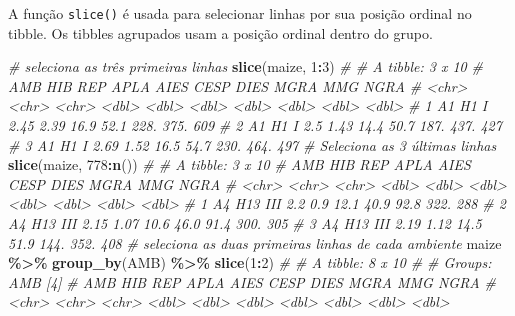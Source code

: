\documentclass[
]{book}
\makeatletter
\newenvironment{Shaded}{\begin{snugshade}}{\end{snugshade}}
\newcommand{\CommentTok}[1]{\textcolor[rgb]{0.56,0.35,0.01}{\textit{#1}}}
\newcommand{\DecValTok}[1]{\textcolor[rgb]{0.00,0.00,0.81}{#1}}
\newcommand{\KeywordTok}[1]{\textcolor[rgb]{0.13,0.29,0.53}{\textbf{#1}}}
\newcommand{\NormalTok}[1]{#1}
\newcommand{\OperatorTok}[1]{\textcolor[rgb]{0.81,0.36,0.00}{\textbf{#1}}}
\newcommand{\StringTok}[1]{\textcolor[rgb]{0.31,0.60,0.02}{#1}}
\numberwithin{equation}{section}
\newcommand{\indf}[1]{\index[function]{#1@\texttt{#1()}|ST}}
\makeatother
\begin{document}
A função \texttt{slice()}\indf{slice} é usada para selecionar linhas por sua posição ordinal no tibble. Os tibbles agrupados usam a posição ordinal dentro do grupo.

\begin{Shaded}
\begin{Highlighting}[]
\CommentTok{\# seleciona as três primeiras linhas}
\KeywordTok{slice}\NormalTok{(maize, }\DecValTok{1}\OperatorTok{:}\DecValTok{3}\NormalTok{)}
\CommentTok{\# \# A tibble: 3 x 10}
\CommentTok{\#   AMB   HIB   REP    APLA  AIES  CESP  DIES  MGRA   MMG  NGRA}
\CommentTok{\#   \textless{}chr\textgreater{} \textless{}chr\textgreater{} \textless{}chr\textgreater{} \textless{}dbl\textgreater{} \textless{}dbl\textgreater{} \textless{}dbl\textgreater{} \textless{}dbl\textgreater{} \textless{}dbl\textgreater{} \textless{}dbl\textgreater{} \textless{}dbl\textgreater{}}
\CommentTok{\# 1 A1    H1    I      2.45  2.39  16.9  52.1  228.  375.   609}
\CommentTok{\# 2 A1    H1    I      2.5   1.43  14.4  50.7  187.  437.   427}
\CommentTok{\# 3 A1    H1    I      2.69  1.52  16.5  54.7  230.  464.   497}
\CommentTok{\# Seleciona as 3 últimas linhas}
\KeywordTok{slice}\NormalTok{(maize, }\DecValTok{778}\OperatorTok{:}\KeywordTok{n}\NormalTok{())}
\CommentTok{\# \# A tibble: 3 x 10}
\CommentTok{\#   AMB   HIB   REP    APLA  AIES  CESP  DIES  MGRA   MMG  NGRA}
\CommentTok{\#   \textless{}chr\textgreater{} \textless{}chr\textgreater{} \textless{}chr\textgreater{} \textless{}dbl\textgreater{} \textless{}dbl\textgreater{} \textless{}dbl\textgreater{} \textless{}dbl\textgreater{} \textless{}dbl\textgreater{} \textless{}dbl\textgreater{} \textless{}dbl\textgreater{}}
\CommentTok{\# 1 A4    H13   III    2.2   0.9   12.1  40.9  92.8  322.   288}
\CommentTok{\# 2 A4    H13   III    2.15  1.07  10.6  46.0  91.4  300.   305}
\CommentTok{\# 3 A4    H13   III    2.19  1.12  14.5  51.9 144.   352.   408}
\CommentTok{\# seleciona as duas primeiras linhas de cada ambiente}
\NormalTok{maize }\OperatorTok{\%\textgreater{}\%}
\StringTok{  }\KeywordTok{group\_by}\NormalTok{(AMB) }\OperatorTok{\%\textgreater{}\%}
\StringTok{  }\KeywordTok{slice}\NormalTok{(}\DecValTok{1}\OperatorTok{:}\DecValTok{2}\NormalTok{)}
\CommentTok{\# \# A tibble: 8 x 10}
\CommentTok{\# \# Groups:   AMB [4]}
\CommentTok{\#   AMB   HIB   REP    APLA  AIES  CESP  DIES  MGRA   MMG  NGRA}
\CommentTok{\#   \textless{}chr\textgreater{} \textless{}chr\textgreater{} \textless{}chr\textgreater{} \textless{}dbl\textgreater{} \textless{}dbl\textgreater{} \textless{}dbl\textgreater{} \textless{}dbl\textgreater{} \textless{}dbl\textgreater{} \textless{}dbl\textgreater{} \textless{}dbl\textgreater{}}

\end{Highlighting}
\end{Shaded}
\end{document}
